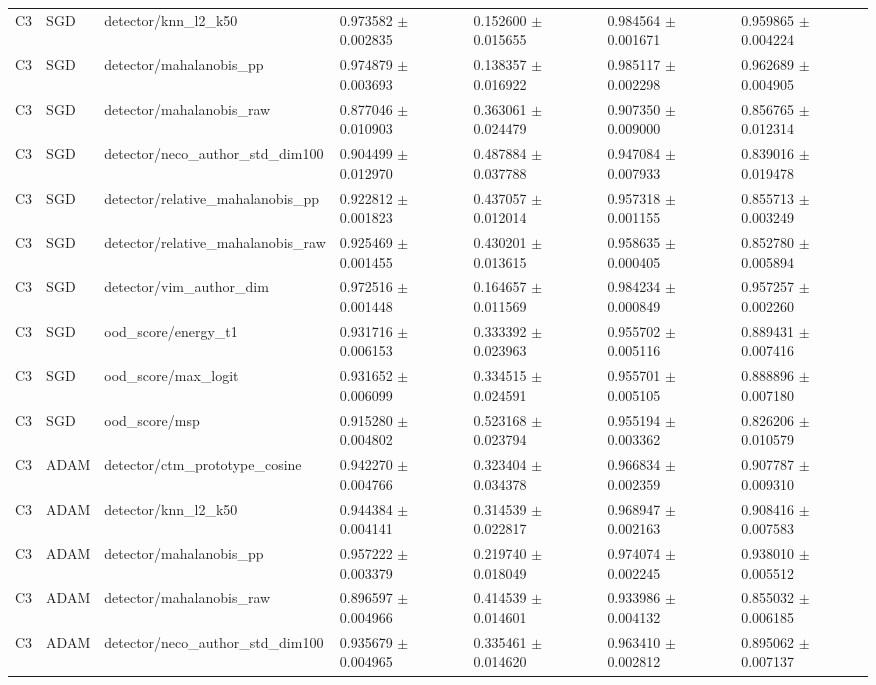 \begin{longtable}{lllllll}
C3 & SGD & detector/knn\_l2\_k50 & 0.973582 $\pm$ 0.002835 & 0.152600 $\pm$ 0.015655 & 0.984564 $\pm$ 0.001671 & 0.959865 $\pm$ 0.004224 \\
C3 & SGD & detector/mahalanobis\_pp & 0.974879 $\pm$ 0.003693 & 0.138357 $\pm$ 0.016922 & 0.985117 $\pm$ 0.002298 & 0.962689 $\pm$ 0.004905 \\
C3 & SGD & detector/mahalanobis\_raw & 0.877046 $\pm$ 0.010903 & 0.363061 $\pm$ 0.024479 & 0.907350 $\pm$ 0.009000 & 0.856765 $\pm$ 0.012314 \\
C3 & SGD & detector/neco\_author\_std\_dim100 & 0.904499 $\pm$ 0.012970 & 0.487884 $\pm$ 0.037788 & 0.947084 $\pm$ 0.007933 & 0.839016 $\pm$ 0.019478 \\
C3 & SGD & detector/relative\_mahalanobis\_pp & 0.922812 $\pm$ 0.001823 & 0.437057 $\pm$ 0.012014 & 0.957318 $\pm$ 0.001155 & 0.855713 $\pm$ 0.003249 \\
C3 & SGD & detector/relative\_mahalanobis\_raw & 0.925469 $\pm$ 0.001455 & 0.430201 $\pm$ 0.013615 & 0.958635 $\pm$ 0.000405 & 0.852780 $\pm$ 0.005894 \\
C3 & SGD & detector/vim\_author\_dim & 0.972516 $\pm$ 0.001448 & 0.164657 $\pm$ 0.011569 & 0.984234 $\pm$ 0.000849 & 0.957257 $\pm$ 0.002260 \\
C3 & SGD & ood\_score/energy\_t1 & 0.931716 $\pm$ 0.006153 & 0.333392 $\pm$ 0.023963 & 0.955702 $\pm$ 0.005116 & 0.889431 $\pm$ 0.007416 \\
C3 & SGD & ood\_score/max\_logit & 0.931652 $\pm$ 0.006099 & 0.334515 $\pm$ 0.024591 & 0.955701 $\pm$ 0.005105 & 0.888896 $\pm$ 0.007180 \\
C3 & SGD & ood\_score/msp & 0.915280 $\pm$ 0.004802 & 0.523168 $\pm$ 0.023794 & 0.955194 $\pm$ 0.003362 & 0.826206 $\pm$ 0.010579 \\
C3 & ADAM & detector/ctm\_prototype\_cosine & 0.942270 $\pm$ 0.004766 & 0.323404 $\pm$ 0.034378 & 0.966834 $\pm$ 0.002359 & 0.907787 $\pm$ 0.009310 \\
C3 & ADAM & detector/knn\_l2\_k50 & 0.944384 $\pm$ 0.004141 & 0.314539 $\pm$ 0.022817 & 0.968947 $\pm$ 0.002163 & 0.908416 $\pm$ 0.007583 \\
C3 & ADAM & detector/mahalanobis\_pp & 0.957222 $\pm$ 0.003379 & 0.219740 $\pm$ 0.018049 & 0.974074 $\pm$ 0.002245 & 0.938010 $\pm$ 0.005512 \\
C3 & ADAM & detector/mahalanobis\_raw & 0.896597 $\pm$ 0.004966 & 0.414539 $\pm$ 0.014601 & 0.933986 $\pm$ 0.004132 & 0.855032 $\pm$ 0.006185 \\
C3 & ADAM & detector/neco\_author\_std\_dim100 & 0.935679 $\pm$ 0.004965 & 0.335461 $\pm$ 0.014620 & 0.963410 $\pm$ 0.002812 & 0.895062 $\pm$ 0.007137 \\

\end{longtable}
